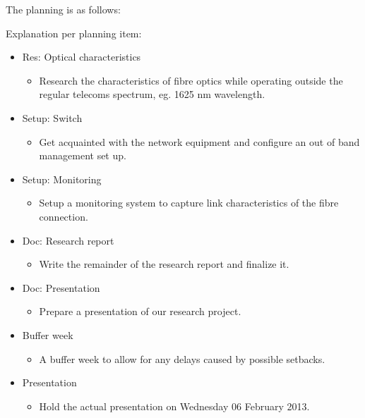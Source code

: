 \documentclass{article}
\begin{document}
The planning is as follows:\\
  \begin{gantt}[xunitlength=50pt]{9}{5}
    \begin{ganttitle}
    \end{ganttitle}
    \begin{ganttitle}
    \end{ganttitle}
  \end{gantt}
\newpage
Explanation per planning item:
\begin{itemize}
  \item Res: Optical characteristics
    \begin{itemize}
      \item Research the characteristics of fibre optics while operating outside the regular telecoms spectrum, eg. 1625 nm wavelength.
    \end{itemize}
  \item Setup: Switch
    \begin{itemize}
      \item Get acquainted with the network equipment and configure an out of band management set up.
    \end{itemize}
  \item Setup: Monitoring
    \begin{itemize}
      \item Setup a monitoring system to capture link characteristics of the fibre connection.
    \end{itemize}
  \item Doc: Research report
    \begin{itemize}
      \item Write the remainder of the research report and finalize it.
    \end{itemize}
  \item Doc: Presentation
    \begin{itemize}
      \item Prepare a presentation of our research project.
    \end{itemize}
  \item Buffer week
    \begin{itemize}
      \item A buffer week to allow for any delays caused by possible setbacks.
    \end{itemize}
  \item Presentation
    \begin{itemize}
      \item Hold the actual presentation on Wednesday 06 February 2013.
    \end{itemize}
\end{itemize}




\end{document}
